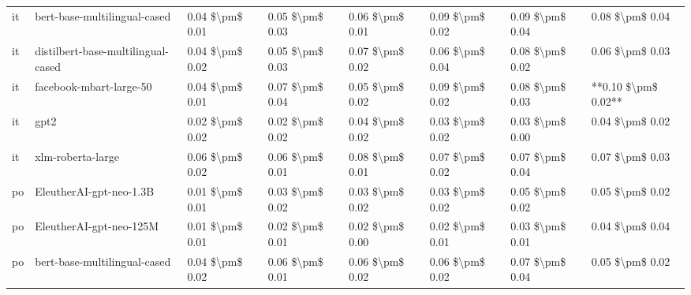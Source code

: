 \begin{tabular}{llllllll}
      it &       bert-base-multilingual-cased & 0.04 \$\textbackslash pm\$ 0.01 &           0.05 \$\textbackslash pm\$ 0.03 &       0.06 \$\textbackslash pm\$ 0.01 &        0.09 \$\textbackslash pm\$ 0.02 &                         0.09 \$\textbackslash pm\$ 0.04 &     0.08 \$\textbackslash pm\$ 0.04 \\
      it & distilbert-base-multilingual-cased & 0.04 \$\textbackslash pm\$ 0.02 &           0.05 \$\textbackslash pm\$ 0.03 &       0.07 \$\textbackslash pm\$ 0.02 &        0.06 \$\textbackslash pm\$ 0.04 &                         0.08 \$\textbackslash pm\$ 0.02 &     0.06 \$\textbackslash pm\$ 0.03 \\
      it &            facebook-mbart-large-50 & 0.04 \$\textbackslash pm\$ 0.01 &           0.07 \$\textbackslash pm\$ 0.04 &       0.05 \$\textbackslash pm\$ 0.02 &        0.09 \$\textbackslash pm\$ 0.02 &                         0.08 \$\textbackslash pm\$ 0.03 & **0.10 \$\textbackslash pm\$ 0.02** \\
      it &                               gpt2 & 0.02 \$\textbackslash pm\$ 0.02 &           0.02 \$\textbackslash pm\$ 0.02 &       0.04 \$\textbackslash pm\$ 0.02 &        0.03 \$\textbackslash pm\$ 0.02 &                         0.03 \$\textbackslash pm\$ 0.00 &     0.04 \$\textbackslash pm\$ 0.02 \\
      it &                  xlm-roberta-large & 0.06 \$\textbackslash pm\$ 0.02 &           0.06 \$\textbackslash pm\$ 0.01 &       0.08 \$\textbackslash pm\$ 0.01 &        0.07 \$\textbackslash pm\$ 0.02 &                         0.07 \$\textbackslash pm\$ 0.04 &     0.07 \$\textbackslash pm\$ 0.03 \\
      po &            EleutherAI-gpt-neo-1.3B & 0.01 \$\textbackslash pm\$ 0.01 &           0.03 \$\textbackslash pm\$ 0.02 &       0.03 \$\textbackslash pm\$ 0.02 &        0.03 \$\textbackslash pm\$ 0.02 &                         0.05 \$\textbackslash pm\$ 0.02 &     0.05 \$\textbackslash pm\$ 0.02 \\
      po &            EleutherAI-gpt-neo-125M & 0.01 \$\textbackslash pm\$ 0.01 &           0.02 \$\textbackslash pm\$ 0.01 &       0.02 \$\textbackslash pm\$ 0.00 &        0.02 \$\textbackslash pm\$ 0.01 &                         0.03 \$\textbackslash pm\$ 0.01 &     0.04 \$\textbackslash pm\$ 0.04 \\
      po &       bert-base-multilingual-cased & 0.04 \$\textbackslash pm\$ 0.02 &           0.06 \$\textbackslash pm\$ 0.01 &       0.06 \$\textbackslash pm\$ 0.02 &        0.06 \$\textbackslash pm\$ 0.02 &                         0.07 \$\textbackslash pm\$ 0.04 &     0.05 \$\textbackslash pm\$ 0.02 \\

\end{tabular}
